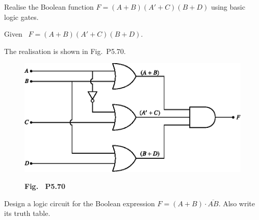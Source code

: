 \begin{problem}\label{prob5.70}
Realise the Boolean function $F=(A+B)(A'+C)(B+D)$ using basic logic gates.
\end{problem}

\begin{solution}
Given~ $F=(A+B)(A'+C)(B+D)$.

The realisation is shown in Fig.~P5.70.
\begin{figure}[H]
\centering
\includegraphics{chap5/figP5.67.eps}

\smallskip
{\bf Fig.~ P5.70}
\end{figure}
\end{solution}

\eject

\begin{problem}\label{prob5.71}
Design a logic circuit for the Boolean expression $F=(A+B)\cdot \overline{AB}$. Also write its truth table.
\end{problem}

